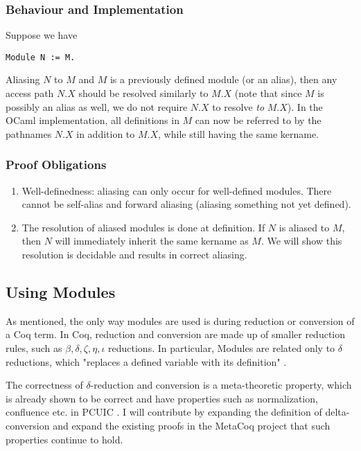 \subsubsection{Behaviour and Implementation}
Suppose we have

\begin{verbatim}
Module N := M.
\end{verbatim}

Aliasing $N$ to $M$ and $M$ is a previously defined module (or an alias),
then any access path $N.X$ should be resolved similarly to
$M.X$ (note that since $M$ is possibly an alias as well, we do not require $N.X$
to resolve \emph{to} $M.X$). In the OCaml implementation, all definitions in $M$
can now be referred to by the pathnames $N.X$ in addition to $M.X$, while still
having the same kername.

\subsubsection{Proof Obligations}
\begin{enumerate}
\item Well-definedness: aliasing can only occur for well-defined modules. There
    cannot be self-alias and forward aliasing (aliasing something not yet defined).
\item The resolution of aliased modules is done at definition. If $N$ is aliased
    to $M$, then $N$ will immediately inherit the same kername as $M$. We will
    show this resolution is decidable and results in correct aliasing.
\end{enumerate}

\subsection{Using Modules}
\label{sec:using-modules}
As mentioned, the only way modules are used is during reduction or conversion
of a Coq term. In Coq, reduction and conversion are made up of smaller reduction
rules, such as $\beta, \delta,\zeta,\eta,\iota$ reductions. In particular, 
Modules are related only to $\delta$ reductions, which "replaces a defined
variable with its definition" 
.

The correctness of $\delta$-reduction and conversion is a meta-theoretic
property, which is already shown to be correct and have properties such as 
normalization, confluence etc. in PCUIC . I will
contribute by expanding the definition of delta-conversion and expand the
existing proofs in the MetaCoq project that such properties continue to hold.